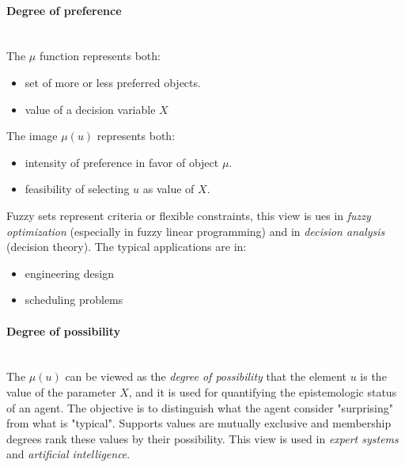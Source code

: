 \documentclass{article}
\begin{document}
\paragraph{Degree of preference}\mbox{}\\
The $\mu$ function represents both:
\begin{itemize}
    \item set of more or less preferred objects.
    \item value of a decision variable $X$
\end{itemize}
The image $\mu(u)$ represents both:
\begin{itemize}
    \item intensity of preference in favor of object $\mu$.
    \item feasibility of selecting $u$ as value of $X$.
\end{itemize}
Fuzzy sets represent criteria or flexible constraints, this view is ues in \textit{fuzzy optimization}
(especially in fuzzy linear programming) and in \textit{decision analysis} (decision theory).
The typical applications are in:
\begin{itemize}
    \item engineering design
    \item scheduling problems
\end{itemize}

\paragraph{Degree of possibility}\mbox{}\\
The $\mu(u)$ can be viewed as the \textit{degree of possibility} that the element $u$
is the value of the parameter $X$, and it is used for quantifying the epistemologic status of
an agent.
\newline\newline
The objective is to distinguish what the agent consider "surprising" from what is "typical".
\newline\newline
Supports values are mutually exclusive and membership degrees rank these values by their
possibility. This view is used in \textit{expert systems} and \textit{artificial intelligence}.
\end{document}
